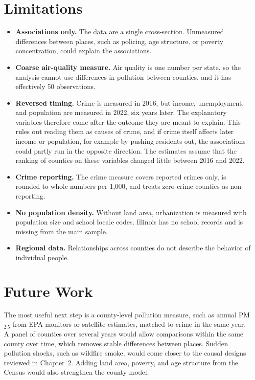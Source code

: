 \documentclass[12pt,letterpaper]{report}
\begin{document}
\section{Limitations}\label{sec:limits}
\begin{itemize}
\item \textbf{Associations only.} The data are a single cross-section. Unmeasured
differences between places, such as policing, age structure, or poverty concentration,
could explain the associations.
\item \textbf{Coarse air-quality measure.} Air quality is one number per state, so the
analysis cannot use differences in pollution between counties, and it has effectively 50
observations.
\item \textbf{Reversed timing.} Crime is measured in 2016, but income, unemployment, and
population are measured in 2022, six years later. The explanatory variables therefore come
after the outcome they are meant to explain. This rules out reading them as causes of crime,
and if crime itself affects later income or population, for example by pushing residents
out, the associations could partly run in the opposite direction. The estimates assume that
the ranking of counties on these variables changed little between 2016 and 2022.
\item \textbf{Crime reporting.} The crime measure covers reported crimes only, is rounded to
whole numbers per 1,000, and treats zero-crime counties as non-reporting.
\item \textbf{No population density.} Without land area, urbanization is measured with
population size and school locale codes. Illinois has no school records and is missing from
the main sample.
\item \textbf{Regional data.} Relationships across counties do not describe the behavior of
individual people.
\end{itemize}

\section{Future Work}
The most useful next step is a county-level pollution measure, such as annual PM$_{2.5}$
from EPA monitors or satellite estimates, matched to crime in the same year. A panel of
counties over several years would allow comparisons within the same county over time, which
removes stable differences between places. Sudden pollution shocks, such as wildfire smoke,
would come closer to the causal designs reviewed in Chapter~2. Adding land area, poverty,
and age structure from the Census would also strengthen the county model.
\end{document}

